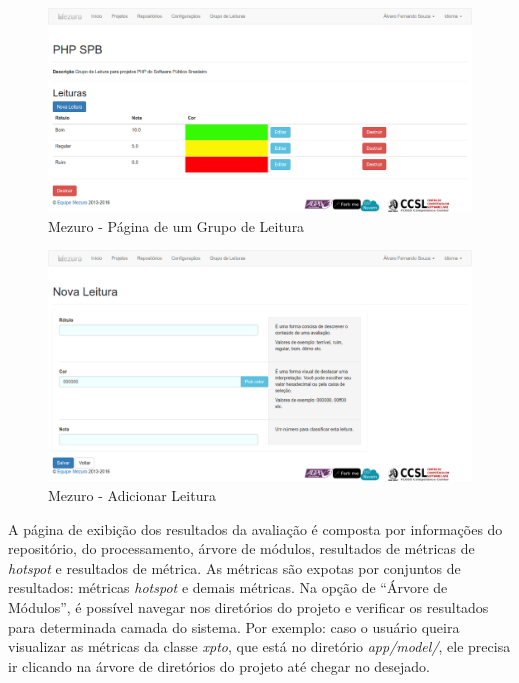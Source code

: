 \newpage

\begin{figure}[!htb]
	\centering
    \includegraphics[keepaspectratio=true,scale=0.3]
    {figuras/mezuro-leitura-view.eps}
  \caption{Mezuro - Página de um Grupo de Leitura}
	\label{fig:mezuro-leitura-view}
\end{figure}

\begin{figure}[!htb]
	\centering
    \includegraphics[keepaspectratio=true,scale=0.3]
    {figuras/mezuro-leitura-add.eps}
  \caption{Mezuro - Adicionar Leitura}
	\label{fig:mezuro-leitura-add}
\end{figure}

\newpage


A página de exibição dos resultados da avaliação é composta por informações do
repositório, do processamento, árvore de módulos, resultados de métricas de
\textit{hotspot} e resultados de métrica.
As métricas são expotas por conjuntos de resultados: métricas \textit{hotspot} e
demais métricas. Na opção de ``Árvore de Módulos'', é possível navegar nos
diretórios do projeto e verificar os resultados para determinada camada do
sistema. Por exemplo: caso o usuário queira visualizar as métricas da classe
\textit{xpto}, que está no diretório \textit{app/model/}, ele precisa ir
clicando na árvore de diretórios do projeto até chegar no desejado.
